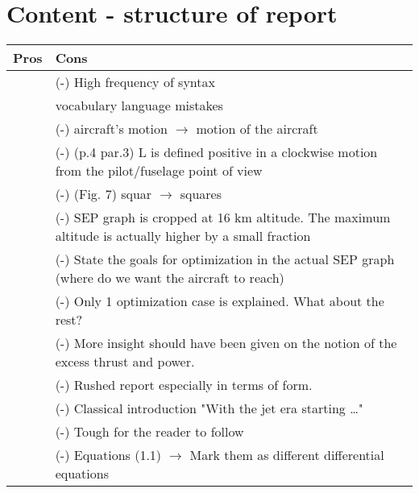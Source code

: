 \section{Content -  structure of report}

\begin{table}[H]
  \centering
    \begin{tabular}{p{7cm}|p{7cm}}
    \toprule
    \textbf{Pros} & \textbf{Cons} \\
    \midrule
          & (-) High frequency of syntax \\& vocabulary language mistakes \\
          & (-) \quad aircraft's motion $\rightarrow$ motion of the aircraft \\
          & (-) \quad (p.4 par.3) L is defined positive in a clockwise motion from the pilot/fuselage point of view \\
          & (-) \quad (Fig. 7) squar $\rightarrow$ squares \\
          & (-) SEP graph is cropped at 16 km altitude. The maximum altitude is actually higher by a small fraction \\
          & (-) State the goals for optimization in the actual SEP graph (where do we want the aircraft to reach) \\
          & (-) Only 1 optimization case is explained. What about the rest? \\
          & (-) More insight should have been given on the notion of the excess thrust and power. \\
          & (-) Rushed report especially in terms of form. \\
          & (-) Classical introduction "With the jet era starting …" \\
          & (-) Tough for the reader to follow \\
          & (-) Equations (1.1) $\rightarrow$ Mark them as different differential equations \\
    \bottomrule
    \end{tabular}%
\end{table}%

